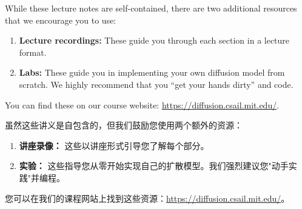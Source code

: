 \begin{remarkbox} 
While these lecture notes are self-contained, there are two additional resources that we encourage you to use:
\begin{enumerate}
    \item \textbf{Lecture recordings:} These guide you through each section in a lecture format.
    \item \textbf{Labs:} These guide you in implementing your own diffusion model from scratch. We highly recommend that you ``get your hands dirty'' and code.
\end{enumerate}
You can find these on our course website: \url{https://diffusion.csail.mit.edu/}.

虽然这些讲义是自包含的，但我们鼓励您使用两个额外的资源：
\begin{enumerate}
    \item \textbf{讲座录像：} 这些以讲座形式引导您了解每个部分。
    \item \textbf{实验：} 这些指导您从零开始实现自己的扩散模型。我们强烈建议您"动手实践"并编程。
\end{enumerate}
您可以在我们的课程网站上找到这些资源：\url{https://diffusion.csail.mit.edu/}。
\end{remarkbox}


